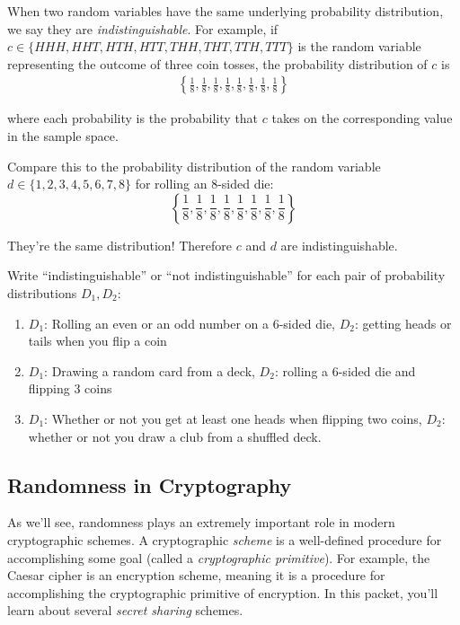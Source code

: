 When two random variables have the same underlying probability 
distribution, we say they are \emph{indistinguishable}. For example,
if $c \in \{HHH, HHT,\allowbreak HTH, HTT, THH, THT, TTH, TTT\}$ 
is the random variable representing the outcome of three coin tosses,
the probability distribution of $c$ is 
\begin{align*}
    \left\{
        \frac{1}{8},\frac{1}{8},\frac{1}{8},\frac{1}{8},
        \frac{1}{8},\frac{1}{8},\frac{1}{8},\frac{1}{8}
    \right\}
\end{align*}

where each probability is the probability that $c$ takes on the 
corresponding value in the sample space.

Compare this to the probability distribution of the random 
variable $d \in \{1,2,3,4,5,6,7,8\}$ for rolling an 8-sided die:
\[
    \left\{
        \frac{1}{8},\frac{1}{8},\frac{1}{8},\frac{1}{8},
        \frac{1}{8},\frac{1}{8},\frac{1}{8},\frac{1}{8}
    \right\}
\]

They're the same distribution! Therefore $c$ and $d$ are 
indistinguishable.

\begin{exercise}
    Write ``indistinguishable'' or ``not indistinguishable''
    for each pair of probability distributions $D_1, D_2$:
    \renewcommand{\labelenumi}{(\alph{enumi})} 
    \begin{enumerate}
        \item $D_1$: Rolling an even or an odd number on a 6-sided die, 
        $D_2$: getting heads or tails when you flip a coin
        \item $D_1$: Drawing a random card from a deck, $D_2$: rolling a 6-sided 
        die and flipping 3 coins
        \item $D_1$: Whether or not you get at least one heads when flipping
        two coins, $D_2$: whether or not you draw a club from a shuffled 
        deck.
    \end{enumerate}
\end{exercise}

\subsection{Randomness in Cryptography}

As we'll see, randomness plays an extremely important role in modern cryptographic
schemes. A cryptographic \emph{scheme} is a well-defined procedure for accomplishing 
some goal (called a \emph{cryptographic primitive}). For example, the Caesar 
cipher is an encryption scheme\footnotemark, meaning it is a procedure for accomplishing
the cryptographic primitive of encryption. 
In this packet, you'll learn about several \emph{secret sharing} schemes.

